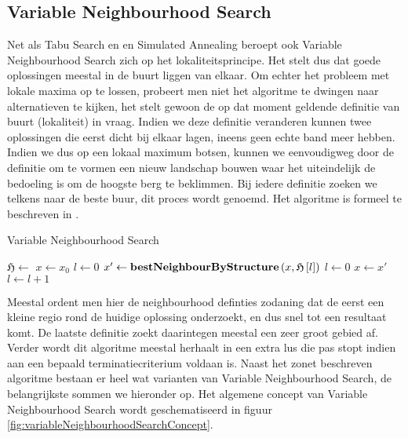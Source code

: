 \subsection{Variable Neighbourhood Search}
\label{ss:variableNeighbourhoodSearch}
Net als Tabu Search en en Simulated Annealing beroept ook Variable Neighbourhood Search zich op het lokaliteitsprincipe. Het stelt dus dat goede oplossingen meestal in de buurt liggen van elkaar. Om echter het probleem met lokale maxima op te lossen, probeert men niet het algoritme te dwingen naar alternatieven te kijken, het stelt gewoon de op dat moment geldende definitie van buurt (lokaliteit) in vraag. Indien we deze definitie veranderen kunnen twee oplossingen die eerst dicht bij elkaar lagen, ineens geen echte band meer hebben. Indien we dus op een lokaal maximum botsen, kunnen we eenvoudigweg door de definitie om te vormen een nieuw landschap bouwen waar het uiteindelijk de bedoeling is om de hoogste berg te beklimmen. Bij iedere definitie zoeken we telkens naar de beste buur, dit proces wordt  genoemd. Het algoritme is formeel te beschreven in .
\begin{algorithm}[htb]                      %
\caption{Variable Neighbourhood Search}          %
\label{alg:variableNeighbourhoodSearch}                           %
\begin{algorithmic}[1]                    %
\STATE $\mathfrak{H}\leftarrow$
\STATE $x\leftarrow x_0$
\STATE $l\leftarrow 0$
\STATE $x'\leftarrow\mbox{\bf bestNeighbourByStructure}\left( x,\mathfrak{H}\left[l\right] \right)$
\STATE $l\leftarrow 0$
\STATE $x\leftarrow x'$
\ELSE
\STATE $l\leftarrow l+1$
\ENDIF
\ENDWHILE
\end{algorithmic}
\end{algorithm}
Meestal ordent men hier de neighbourhood definties zodaning dat de eerst een kleine regio rond de huidige oplossing onderzoekt, en dus snel tot een resultaat komt. De laatste definitie zoekt daarintegen meestal een zeer groot gebied af. Verder wordt dit algoritme meestal herhaalt in een extra lus die pas stopt indien aan een bepaald terminatiecriterium voldaan is. Naast het zonet beschreven algoritme bestaan er heel wat varianten van Variable Neighbourhood Search, de belangrijkste sommen we hieronder op. Het algemene concept van Variable Neighbourhood Search wordt geschematiseerd in figuur \ref{fig:variableNeighbourhoodSearchConcept}.
